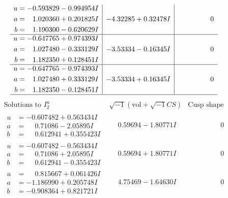 \documentclass[1p]{elsarticle_modified}
\theoremstyle{definition}
\newcommand{\I}{\sqrt{-1}}
\begin{document}
$$\begin{array}{c|c|c}
\begin{aligned}
u &= -0.593829 - 0.994954 I \\
a &= \phantom{-}1.020360 + 0.201825 I \\
b &= \phantom{-}1.190300 - 0.620629 I\end{aligned}
 & -4.32285 + 0.32478 I & \phantom{-0.000000 } 0 \\ \hline\begin{aligned}
u &= -0.647765 + 0.974393 I \\
a &= \phantom{-}1.027480 - 0.333129 I \\
b &= \phantom{-}1.182350 + 0.128451 I\end{aligned}
 & -3.53334 - 0.16345 I & \phantom{-0.000000 } 0 \\ \hline\begin{aligned}
u &= -0.647765 - 0.974393 I \\
a &= \phantom{-}1.027480 + 0.333129 I \\
b &= \phantom{-}1.182350 - 0.128451 I\end{aligned}
 & -3.53334 + 0.16345 I & \phantom{-0.000000 } 0\\
 \hline 
 \end{array}$$\newpage$$\begin{array}{c|c|c}  
\text{Solutions to }I^u_{2}& \I (\text{vol} + \sqrt{-1}CS) & \text{Cusp shape}\\
 \hline 
\begin{aligned}
u &= -0.607482 + 0.563434 I \\
a &= \phantom{-}0.71086 - 2.05895 I \\
b &= \phantom{-}0.612941 + 0.355423 I\end{aligned}
 & \phantom{-}0.59694 - 1.80771 I & \phantom{-0.000000 } 0 \\ \hline\begin{aligned}
u &= -0.607482 - 0.563434 I \\
a &= \phantom{-}0.71086 + 2.05895 I \\
b &= \phantom{-}0.612941 - 0.355423 I\end{aligned}
 & \phantom{-}0.59694 + 1.80771 I & \phantom{-0.000000 } 0 \\ \hline\begin{aligned}
u &= \phantom{-}0.815667 + 0.061426 I \\
a &= -1.186990 + 0.205748 I \\
b &= -0.908364 + 0.821721 I\end{aligned}
 & \phantom{-}4.75469 - 1.64630 I & \phantom{-0.000000 } 0 \\ \hline\begin{aligned}

\end{aligned}
\end{array}$$
\end{document}
